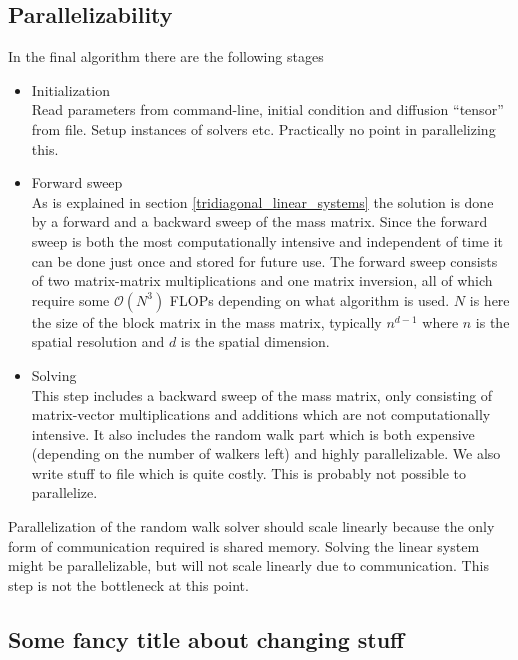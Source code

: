 \subsection{Parallelizability}
In the final algorithm there are the following stages
\begin{itemize}
 \item Initialization\\
 Read parameters from command-line, initial condition and diffusion ``tensor'' from file. Setup instances of solvers etc. Practically no point in parallelizing this.
 \item Forward sweep\\
  As is explained in section \ref{tridiagonal_linear_systems} the solution is done by a forward and a backward sweep of the mass matrix. 
  Since the forward sweep is both the most computationally intensive and independent of time it can be done just once and stored for future use. 
  The forward sweep consists of two matrix-matrix multiplications and one matrix inversion, all of which require some $\mathcal O(N^3)$ FLOPs depending on what algorithm is used. 
  $N$ is here the size of the block matrix in the mass matrix, typically $n^{d-1}$ where $n$ is the spatial resolution and $d$ is the spatial dimension.
 \item Solving\\
 This step includes a backward sweep of the mass matrix, only consisting of matrix-vector multiplications and additions which are not computationally intensive. It also includes the random walk part which is both expensive (depending on the number of walkers left) and highly parallelizable. We also write stuff to file which is quite costly. This is probably not possible to parallelize.
\end{itemize}

Parallelization of the random walk solver should scale linearly because the only form of communication required is shared memory. 
Solving the linear system might be parallelizable, but will not scale linearly due to communication. This step is not the bottleneck at this point.

\subsection{Some fancy title about changing stuff}

